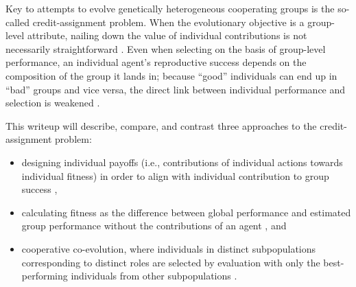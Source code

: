 Key to attempts to evolve genetically heterogeneous cooperating groups is the so-called credit-assignment problem.
When the evolutionary objective is a group-level attribute, nailing down the value of individual contributions is not necessarily straightforward \cite{panait2005cooperative}.
Even when selecting on the basis of group-level performance, an individual agent's reproductive success depends on the composition of the group it lands in; because ``good'' individuals can end up in ``bad'' groups and vice versa, the direct link between individual performance and selection is weakened \cite{waibel2009genetic}.

This writeup will describe, compare, and contrast three approaches to the credit-assignment problem:
\begin{itemize}
  \item designing individual payoffs (i.e., contributions of individual actions towards individual fitness) in order to align with individual contribution to group success \cite{waibel2009genetic},
  \item calculating fitness as the difference between global performance and estimated group performance without the contributions of an agent \cite{knudson2010coevolution}, and
  \item cooperative co-evolution, where individuals in distinct subpopulations corresponding to distinct roles are selected by evaluation with only the best-performing individuals from other subpopulations \cite{gomes2015cooperative}.
\end{itemize}
